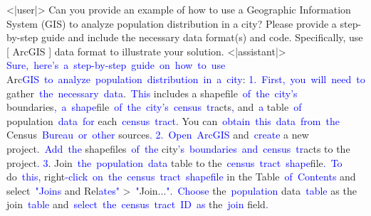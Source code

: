 \documentclass{article}
\begin{document}
\begin{tcolorbox}[colframe=black,colback=white]
<|user|>
Can you provide an example of how to use a Geographic Information System (GIS) to analyze population distribution in a city? Please provide a step-by-step guide and include the necessary data format(s) and code. Specifically, use [ ArcGIS ] data format to illustrate your solution.
<|assistant|>
\textcolor{blue}{Sure}\textcolor{blue}{,}\textcolor{blue}{~here}\textcolor{blue}{'s}\textcolor{blue}{~a}\textcolor{blue}{~step}\textcolor{blue}{-by}\textcolor{blue}{-step}\textcolor{blue}{~guide}\textcolor{blue}{~on}\textcolor{blue}{~how}\textcolor{blue}{~to}\textcolor{blue}{~use} Arc\textcolor{blue}{GIS}\textcolor{blue}{~to}\textcolor{blue}{~analyze}\textcolor{blue}{~population}\textcolor{blue}{~distribution}\textcolor{blue}{~in}\textcolor{blue}{~a}\textcolor{blue}{~city}:
\textcolor{blue}{1}\textcolor{blue}{.}\textcolor{blue}{~First}\textcolor{blue}{,}\textcolor{blue}{~you}\textcolor{blue}{~will}\textcolor{blue}{~need}\textcolor{blue}{~to} gather\textcolor{blue}{~the}\textcolor{blue}{~necessary}\textcolor{blue}{~data}.\textcolor{blue}{~This} includes a shapefile\textcolor{blue}{~of}\textcolor{blue}{~the}\textcolor{blue}{~city}\textcolor{blue}{'s} boundaries\textcolor{blue}{,}\textcolor{blue}{~a}\textcolor{blue}{~shape}file\textcolor{blue}{~of}\textcolor{blue}{~the}\textcolor{blue}{~city}\textcolor{blue}{'s}\textcolor{blue}{~census}\textcolor{blue}{~tr}acts\textcolor{blue}{,} and\textcolor{blue}{~a} table\textcolor{blue}{~of} population\textcolor{blue}{~data}\textcolor{blue}{~for} each\textcolor{blue}{~census}\textcolor{blue}{~tract}. You can\textcolor{blue}{~obtain}\textcolor{blue}{~this}\textcolor{blue}{~data}\textcolor{blue}{~from}\textcolor{blue}{~the} Census\textcolor{blue}{~Bureau}\textcolor{blue}{~or}\textcolor{blue}{~other} sources\textcolor{blue}{.
}\textcolor{blue}{2}\textcolor{blue}{.}\textcolor{blue}{~Open}\textcolor{blue}{~Arc}\textcolor{blue}{GIS} and\textcolor{blue}{~create} a new project.\textcolor{blue}{~Add}\textcolor{blue}{~the} shapefiles\textcolor{blue}{~of}\textcolor{blue}{~the} city\textcolor{blue}{'s}\textcolor{blue}{~boundaries}\textcolor{blue}{~and}\textcolor{blue}{~census}\textcolor{blue}{~tr}acts to the project\textcolor{blue}{.
}\textcolor{blue}{3}. Join\textcolor{blue}{~the}\textcolor{blue}{~population}\textcolor{blue}{~data} table to the\textcolor{blue}{~census}\textcolor{blue}{~tract}\textcolor{blue}{~shape}file\textcolor{blue}{.}\textcolor{blue}{~To} do\textcolor{blue}{~this}\textcolor{blue}{,} right\textcolor{blue}{-click}\textcolor{blue}{~on}\textcolor{blue}{~the}\textcolor{blue}{~census}\textcolor{blue}{~tract}\textcolor{blue}{~shape}\textcolor{blue}{file} in the Table\textcolor{blue}{~of}\textcolor{blue}{~Contents} and select\textcolor{blue}{~"}\textcolor{blue}{Jo}\textcolor{blue}{ins} and Rel\textcolor{blue}{ates}\textcolor{blue}{"} >\textcolor{blue}{~"}Join...\textcolor{blue}{".}\textcolor{blue}{~Choose} the\textcolor{blue}{~population} data\textcolor{blue}{~table} as the join\textcolor{blue}{~table} and\textcolor{blue}{~select}\textcolor{blue}{~the}\textcolor{blue}{~census}\textcolor{blue}{~tract}\textcolor{blue}{~ID}\textcolor{blue}{~as} the\textcolor{blue}{~join} field\textcolor{blue}{.
}
\end{tcolorbox}
\end{document}
